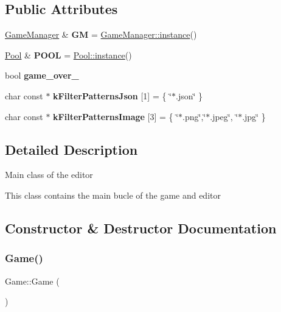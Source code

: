 \subsection*{Public Attributes}
\begin{DoxyCompactItemize}
\item 
\mbox{\label{class_game_abdaa5299f22a22a628149cda5040c5c8}} 
\hyperlink{class_game_manager}{Game\+Manager} \& {\bfseries GM} = \hyperlink{class_game_manager_afa37ab23c040b5225d567d4c9ab854e1}{Game\+Manager\+::instance}()
\item 
\mbox{\label{class_game_aa22c10008978460e1dea4d6fbfa70b53}} 
\hyperlink{class_pool}{Pool} \& {\bfseries P\+O\+OL} = \hyperlink{class_pool_a20e44e0054d4eedf57f1943b87c06e20}{Pool\+::instance}()
\item 
\mbox{\label{class_game_af4325db0c4cd8e4f51fd2b3567191d66}} 
bool {\bfseries game\+\_\+over\+\_\+}
\item 
\mbox{\label{class_game_acd6e7363beb1cdf8a208f07ec41f39ae}} 
char const  $\ast$ {\bfseries k\+Filter\+Patterns\+Json} \mbox{[}1\mbox{]} = \{ \char`\"{}$\ast$.json\char`\"{} \}
\item 
\mbox{\label{class_game_a6abb1fb644b47a9ad92cad622b1b7222}} 
char const  $\ast$ {\bfseries k\+Filter\+Patterns\+Image} \mbox{[}3\mbox{]} = \{ \char`\"{}$\ast$.png\char`\"{},\char`\"{}$\ast$.jpeg\char`\"{}, \char`\"{}$\ast$.jpg\char`\"{} \}
\end{DoxyCompactItemize}


\subsection{Detailed Description}
Main class of the editor

This class contains the main bucle of the game and editor 

\subsection{Constructor \& Destructor Documentation}
\mbox{\label{class_game_ad59df6562a58a614fda24622d3715b65}} 
\subsubsection{\texorpdfstring{Game()}{Game()}}
{\footnotesize\ttfamily Game\+::\+Game (\begin{DoxyParamCaption}{ }\end{DoxyParamCaption})}

